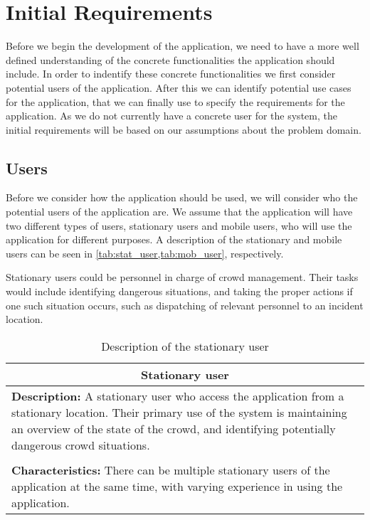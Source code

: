 \section{Initial Requirements}\label{sec:s1_requirements}
Before we begin the development of the application, we need to have a more well defined understanding of the concrete functionalities the application should include. In order to indentify these concrete functionalities we first consider potential users of the application. After this we can identify potential use cases for the application, that we can finally use to specify the requirements for the application. As we do not currently have a concrete user for the system, the initial requirements will be based on our assumptions about the problem domain. 

\subsection{Users}
Before we consider how the application should be used, we will consider who the potential users of the application are. We assume that the application will have two different types of users, stationary users and mobile users, who will use the application for different purposes. A description of the stationary and mobile users can be seen in \cref{tab:stat_user,tab:mob_user}, respectively.

Stationary users could be personnel in charge of crowd management. Their tasks would include identifying dangerous situations, and taking the proper actions if one such situation occurs, such as dispatching of relevant personnel to an incident location.

\begin{table}[h!]
    \centering
    \begin{tabularx}{/4}{X}
        \toprule
        \multicolumn{1}{c}{\textbf{Stationary user}} \\ 
        \midrule
        \textbf{Description:} A stationary user who access the application from a stationary location. Their primary use of the system is maintaining an overview of the state of the crowd, and identifying potentially dangerous crowd situations. \\
        \\
        \textbf{Characteristics:} There can be multiple stationary users of the application at the same time, with varying experience in using the application. \\
        \bottomrule
    \end{tabularx}
    \caption{Description of the stationary user}
    \label{tab:stat_user}
\end{table}

